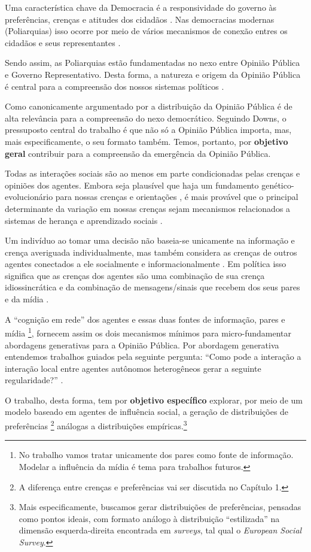 Uma característica chave da Democracia é a responsividade do governo às
preferências, crenças e atitudes dos cidadãos
\cite{dahl1973polyarchy,bartels2003democracy}. Nas democracias modernas
(Poliarquias) isso ocorre por meio de vários mecanismos de conexão entres os
cidadãos e seus representantes \cite{dahl1989democracy,
  schumpeter2013capitalism}.

Sendo assim, as Poliarquias estão fundamentadas no nexo entre Opinião Pública e
Governo Representativo. Desta forma, a natureza e origem da Opinião Pública é
central para a compreensão dos nossos sistemas políticos
\cite{berelson1952democratic}.

Como canonicamente argumentado por  a distribuição
da Opinião Pública é de alta relevância para a compreensão do nexo democrático.
Seguindo Downs, o pressuposto central do trabalho é que não só a Opinião Pública
importa, mas, mais especificamente, o seu formato também. Temos, portanto, por
\textbf{objetivo geral} contribuir para a compreensão da emergência da Opinião
Pública.

Todas as interações sociais são ao menos em parte condicionadas pelas crenças e
opiniões dos agentes. Embora seja plausível que haja um fundamento
genético-evolucionário para nossas crenças e orientações
\cite{fowler2008biology, fowler2013defense}, é mais provável que o principal
determinante da variação em  nossas crenças sejam  mecanismos relacionados a 
sistemas de herança e aprendizado sociais \cite{jablonka2014evolution}.

Um indivíduo ao tomar uma decisão não baseia-se unicamente na informação e
crença averiguada individualmente, mas também considera as crenças de outros
agentes conectados a ele socialmente e informacionalmente
\cite{gintis2016individuality}. Em política isso significa que as crenças dos
agentes são uma combinação de sua crença idiossincrática e da combinação de
mensagens/sinais que recebem dos seus pares e da mídia
\cite{barabas2004deliberation,ryan2011social}.


A ``cognição em rede'' dos agentes e essas duas fontes de informação, pares e
mídia \footnote{No trabalho vamos tratar unicamente dos pares como fonte de
  informação. Modelar a influência da mídia é tema para trabalhos futuros.},
fornecem assim os dois mecanismos mínimos para micro-fundamentar abordagens
generativas para a Opinião Pública. Por abordagem generativa entendemos
trabalhos guiados pela seguinte pergunta: ``Como pode a interação a interação
local entre agentes autônomos heterogêneos  gerar a seguinte regularidade?''
.

O trabalho, desta forma, tem por \textbf{objetivo específico} explorar, por meio
de um modelo baseado em agentes de influência social, a geração de distribuições
de preferências \footnote{A diferença entre crenças e preferências vai ser
  discutida no Capítulo 1.} análogas a distribuições empíricas.\footnote{Mais
  especificamente, buscamos gerar distribuições de preferências, pensadas como
  pontos ideais, com formato análogo à distribuição ``estilizada'' na dimensão
  esquerda-direita encontrada em \textit{surveys}, tal qual o \textit{European
    Social Survey}.}




